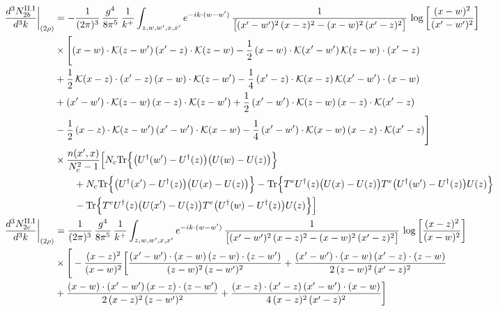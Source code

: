 \documentclass[9pt]{article}
\numberwithin{equation}{section}
\begin{document}
\begin{align}
\frac{d^{3}N^{\rm II.I}_{2b}}{d^{3}k}\bigg|_{(2\rho)}&= -\frac{1}{(2\pi)^{3}}\,\frac{g^{4}}{8\pi^{5}}\,\frac{1}{k^{+}}\int_{z,w,w^{\prime},x,x^{\prime}}e^{-ik\cdot(w-w^{\prime})}\,\frac{1}{\big[(x^{\prime}-w^{\prime})^{2}\,(x-z)^{2}-(x-w)^{2}\,(x^{\prime}-z)^{2}\big]}\,\log\left[\frac{(x-w)^{2}}{(x^{\prime}-w^{\prime})^{2}}\right]\notag\\
&\times\Bigg[(x-w)\cdot\mathcal{K}(z-w^{\prime})\,(x^{\prime}-z)\cdot\mathcal{K}(z-w)-\frac{1}{2}\,(x-w)\cdot\mathcal{K}(x^{\prime}-w^{\prime})\,\mathcal{K}(z-w)\cdot(x^{\prime}-z)\notag \\ & +\frac{1}{2}\,\mathcal{K}(x-z)\cdot(x^{\prime}-z)\,(x-w)\cdot\mathcal{K}(z-w^{\prime}) -\frac{1}{4}\,(x^{\prime}-z)\cdot\mathcal{K}(x-z)\,\mathcal{K}(x^{\prime}-w^{\prime})\cdot(x-w)\notag \\ & +(x^{\prime}-w^{\prime})\cdot\mathcal{K}(z-w)\,(x-z)\cdot\mathcal{K}(z-w^{\prime})+\frac{1}{2}\,(x^{\prime}-w^{\prime})\cdot\mathcal{K}(z-w)\,(x-z)\cdot\mathcal{K}(x^{\prime}-z)\notag \\ & -\frac{1}{2}\,(x-z)\cdot\mathcal{K}(z-w^{\prime})\,(x^{\prime}-w^{\prime})\cdot\mathcal{K}(x-w)-\frac{1}{4}\,(x^{\prime}-w^{\prime})\cdot\mathcal{K}(x-w)\,(x-z)\cdot\mathcal{K}(x^{\prime}-z)\Bigg]\notag\\ &\times\frac{n(x',x)}{N_{c}^{2}-1}\Big[N_{c}{\rm Tr}\Big\{\big(U^{\dagger}(w')-U^{\dagger}(z)\big)\big(U(w)-U(z)\big)\Big\}\notag\\&\qquad+N_{c}{\rm Tr}\Big\{\big(U^{\dagger}(x')-U^{\dagger}(z)\big)\big(U(x)-U(z)\big)\Big\}-{\rm Tr}\Big\{T^{e}U^{\dagger}(z)\big(U(x)-U(z)\big)T^{e}\big(U^{\dagger}(w')-U^{\dagger}(z)\big)U(z)\Big\}\notag\\&\qquad-{\rm Tr}\Big\{T^{e}U^{\dagger}(z)\big(U(x')-U(z)\big)T^{e}\big(U^{\dagger}(w)-U^{\dagger}(z)\big)U(z)\Big\}\Big]\\
\frac{d^{3}N^{\rm II.I}_{2c}}{d^{3}k}\bigg|_{(2\rho)} &= \frac{1}{(2\pi)^{3}}\,\frac{g^{4}}{8\pi^{5}}\,\frac{1}{k^{+}}\int_{z,w,w^{\prime},x,x^{\prime}}e^{-ik\cdot(w-w^{\prime})}\,\frac{1}{\big[(x^{\prime}-w^{\prime})^{2}\,(x-z)^{2}-(x-w)^{2}\,(x^{\prime}-z)^{2}\big]}\,\log\left[\frac{(x-z)^{2}}{(x-w)^{2}}\right]\notag\\
&\times\Bigg[-\frac{(x-z)^{2}}{(x-w)^{2}}\bigg[\frac{(x^{\prime}-w^{\prime})\cdot(x-w)\,(z-w)\cdot(z-w^{\prime})}{(z-w)^{2}\,(z-w^{\prime})^{2}}+\frac{(x^{\prime}-w^{\prime})\cdot(x-w)\,(x^{\prime}-z)\cdot(z-w)}{2\,(z-w)^{2}\,(x^{\prime}-z)^{2}}\notag \\ & +\frac{(x-w)\cdot(x^{\prime}-w^{\prime})\,(x-z)\cdot(z-w^{\prime})}{2\,(x-z)^{2}\,(z-w^{\prime})^{2}}+\frac{(x-z)\cdot(x^{\prime}-z)\,(x^{\prime}-w^{\prime})\cdot(x-w)}{4\,(x-z)^{2}\,(x^{\prime}-z)^{2}}\bigg]\notag\\

\end{align}
\end{document}
